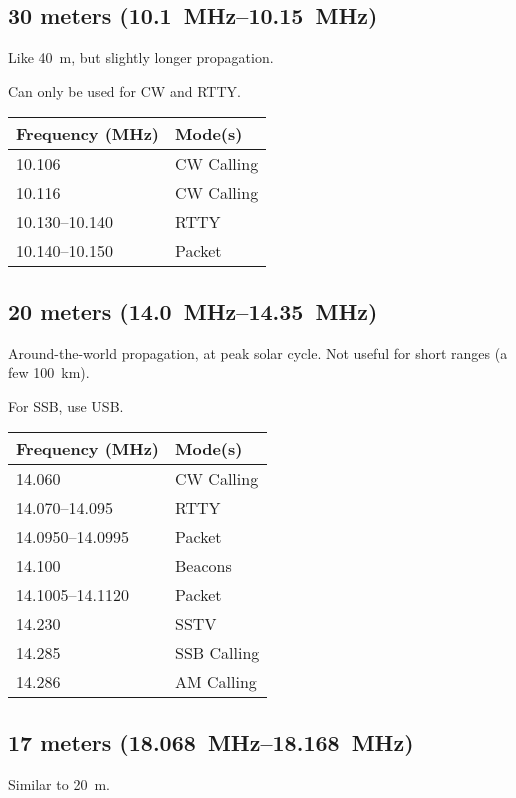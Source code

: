 \documentclass[11pt, twocolumn]{article}
\begin{document}
\subsection{30 meters (\SIrange{10.1}{10.15}{\MHz})}
Like \SI{40}{m}, but slightly longer propagation.

Can only be used for CW and RTTY.
\begin{center}
  \begin{tabular}{l l}
    {Frequency (\si{\MHz})}		&	Mode(s)			\\
    \midrule
    \num{10.106}				&	CW Calling		\\
    \num{10.116}				&	CW Calling		\\
    \numrange{10.130}{10.140}	&	RTTY			\\
    \numrange{10.140}{10.150}	&	Packet			\\
  \end{tabular}
\end{center}


\subsection{20 meters (\SIrange{14.0}{14.35}{\MHz})}
Around-the-world propagation, at peak solar cycle. Not
useful for short ranges (a few \SI{100}{\km}).

For SSB, use USB.
\begin{center}
  \begin{tabular}{l l}
    {Frequency (\si{\MHz})}		&	Mode(s)			\\
    \midrule
    \num{14.060}				&	CW Calling		\\
    \numrange{14.070}{14.095}	&	RTTY			\\
    \numrange{14.0950}{14.0995}	&	Packet			\\
    \num{14.100}				&	Beacons			\\
    \numrange{14.1005}{14.1120}	&	Packet			\\
    \num{14.230}				&	SSTV			\\
    \num{14.285}				&	SSB Calling		\\
    \num{14.286}				&	AM Calling		\\
  \end{tabular}
\end{center}


\subsection{17 meters (\SIrange{18.068}{18.168}{\MHz})}
Similar to \SI{20}{m}.
\end{document}
